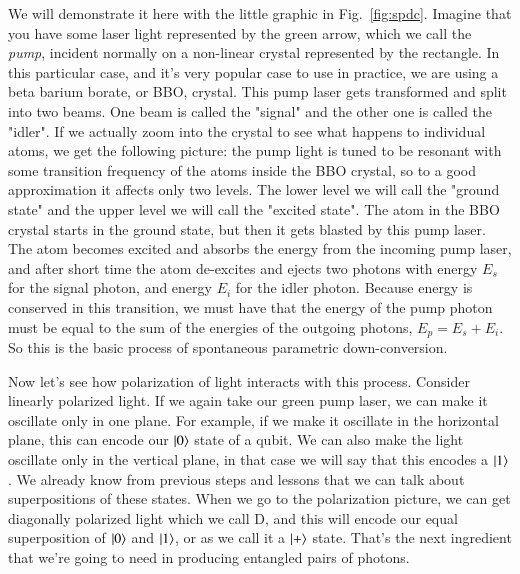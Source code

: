 We will demonstrate it here with the little graphic in Fig.~\ref{fig:spdc}. Imagine that you have some laser light
represented by the green arrow, which we call the \emph{pump}, incident normally on a non-linear crystal represented by the rectangle. In this particular case, and it's very popular case to use in practice, we are using a beta barium borate, or BBO, crystal. This pump laser gets transformed and split into two beams. One beam is called the "signal" and the other one is called the "idler". If we actually zoom into the crystal to see what happens to individual atoms, we get the following picture: the pump light is tuned to be resonant with some transition frequency of the atoms inside the BBO crystal, so to a good approximation it affects only two levels. The lower level we will call the "ground state" and the upper level we will call the "excited state". The atom in the BBO crystal starts in the ground state, but then it gets blasted by this pump laser.  The atom becomes excited and absorbs the energy from the incoming pump laser, and after short time the atom de-excites and ejects two photons with energy $E_s$ for the signal photon, and energy $E_i$ for the idler photon.  Because energy is conserved in this transition, we must have that the energy of the pump photon must be equal to the sum of the energies of the outgoing photons, $E_p = E_s + E_i$. So this is the basic process of spontaneous parametric down-conversion.

Now let's see how polarization of light interacts with this process. Consider linearly polarized light. If we again take our green pump laser, we can make it oscillate only in one plane. For example, if we make it oscillate in the horizontal plane, this can encode our $\left| 0 \right\rangle$ state of a qubit. We can also make the light oscillate only in the vertical plane, in that case we will say that this encodes a $\left| 1 \right\rangle$. We already know from previous steps and lessons that we can talk about superpositions of these states. When we go to the polarization picture, we can get diagonally polarized light which we call D, and this will encode our equal superposition of $\left| 0 \right\rangle$ and $\left| 1 \right\rangle$, or as we call it a $\left| + \right\rangle$ state. That's the next ingredient that we're going to need in producing entangled pairs of photons.

